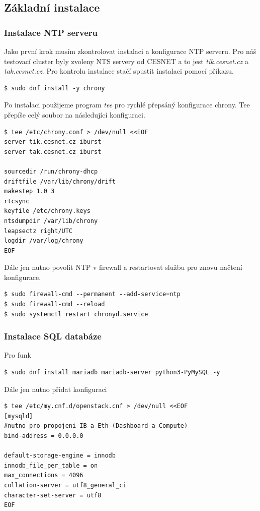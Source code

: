 \subsection{Základní instalace}

\subsubsection{Instalace NTP serveru}
Jako první krok musím zkontrolovat instalaci a konfigurace NTP serveru. Pro náš testovací cluster byly zvoleny NTS servery od CESNET\cite{CESNET} a to jest \textit{tik.cesnet.cz} a \textit{tak.cesnet.cz}. Pro kontrolu instalace stačí spustit instalaci pomocí příkazu.

\begin{verbatim}
$ sudo dnf install -y chrony
\end{verbatim}

\newpage

Po instalaci použijeme program \textit{tee} pro rychlé přepsáný konfigurace chrony. Tee přepíše celý soubor na následující konfiguraci.

\begin{verbatim}
$ tee /etc/chrony.conf > /dev/null <<EOF
server tik.cesnet.cz iburst
server tak.cesnet.cz iburst

sourcedir /run/chrony-dhcp
driftfile /var/lib/chrony/drift
makestep 1.0 3
rtcsync
keyfile /etc/chrony.keys
ntsdumpdir /var/lib/chrony
leapsectz right/UTC
logdir /var/log/chrony
EOF
\end{verbatim}

Dále jen nutno povolit NTP v firewall a restartovat službu pro znovu načtení konfigurace.
\begin{verbatim}
$ sudo firewall-cmd --permanent --add-service=ntp
$ sudo firewall-cmd --reload
$ sudo systemctl restart chronyd.service
\end{verbatim}

\subsubsection{Instalace SQL databáze}
Pro funk
\begin{verbatim}
$ sudo dnf install mariadb mariadb-server python3-PyMySQL -y
\end{verbatim}

Dále jen nutno přidat konfiguraci

\begin{verbatim}
$ tee /etc/my.cnf.d/openstack.cnf > /dev/null <<EOF
[mysqld]
#nutno pro propojeni IB a Eth (Dashboard a Compute)
bind-address = 0.0.0.0 

default-storage-engine = innodb
innodb_file_per_table = on
max_connections = 4096
collation-server = utf8_general_ci
character-set-server = utf8
EOF
\end{verbatim}

